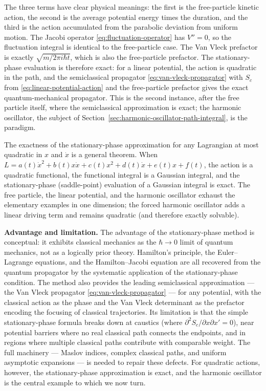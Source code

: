 The three terms have clear physical meanings: the first is the free-particle kinetic action, the second is the average potential energy times the duration, and the third is the action accumulated from the parabolic deviation from uniform motion. The Jacobi operator \eqref{eq:fluctuation-operator} has $V'' = 0$, so the fluctuation integral is identical to the free-particle case. The Van Vleck prefactor is exactly $\sqrt{m/2\pi i\hbar t}$, which is also the free-particle prefactor. The stationary-phase evaluation is therefore exact: for a linear potential, the action is quadratic in the path, and the semiclassical propagator \eqref{eq:van-vleck-propagator} with $S_c$ from \eqref{eq:linear-potential-action} and the free-particle prefactor gives the exact quantum-mechanical propagator. This is the second instance, after the free particle itself, where the semiclassical approximation is exact; the harmonic oscillator, the subject of Section~\ref{sec:harmonic-oscillator-path-integral}, is the paradigm.

\begin{note}
The exactness of the stationary-phase approximation for any Lagrangian at most quadratic in $x$ and $\dot{x}$ is a general theorem. When $L = a(t)\dot{x}^2 + b(t)x\dot{x} + c(t)x^2 + d(t)\dot{x} + e(t)x + f(t)$, the action is a quadratic functional, the functional integral is a Gaussian integral, and the stationary-phase (saddle-point) evaluation of a Gaussian integral is exact. The free particle, the linear potential, and the harmonic oscillator exhaust the elementary examples in one dimension; the forced harmonic oscillator adds a linear driving term and remains quadratic (and therefore exactly solvable).
\end{note}

\medskip\noindent\textbf{Advantage and limitation.}
The advantage of the stationary-phase method is conceptual: it exhibits classical mechanics as the $\hbar\to0$ limit of quantum mechanics, not as a logically prior theory. Hamilton's principle, the Euler--Lagrange equations, and the Hamilton--Jacobi equation are all recovered from the quantum propagator by the systematic application of the stationary-phase condition. The method also provides the leading semiclassical approximation --- the Van Vleck propagator \eqref{eq:van-vleck-propagator} --- for any potential, with the classical action as the phase and the Van Vleck determinant as the prefactor encoding the focusing of classical trajectories. Its limitation is that the simple stationary-phase formula breaks down at caustics (where $\partial^2 S_c / \partial x \partial x' = 0$), near potential barriers where no real classical path connects the endpoints, and in regions where multiple classical paths contribute with comparable weight. The full machinery --- Maslov indices, complex classical paths, and uniform asymptotic expansions --- is needed to repair these defects. For quadratic actions, however, the stationary-phase approximation is exact, and the harmonic oscillator is the central example to which we now turn.



